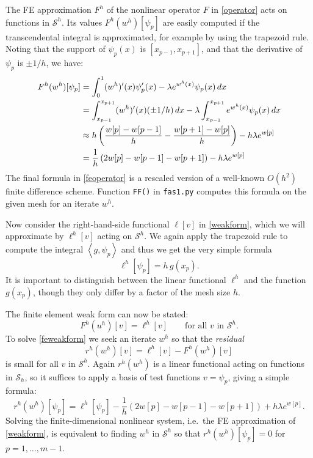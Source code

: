\documentclass[letterpaper,final,12pt,reqno]{amsart}
\newcommand{\ip}[2]{\left<#1,#2\right>}
\begin{document}
The FE approximation $F^h$ of the nonlinear operator $F$ in \eqref{operator} acts on functions in $\mathcal{S}^h$.  Its values $F^h(w^h)[\psi_p]$ are easily computed if the transcendental integral is approximated, for example by using the trapezoid rule.  Noting that the support of $\psi_p(x)$ is $[x_{p-1},x_{p+1}]$, and that the derivative of $\psi_p$ is $\pm 1/h$, we have:
\begin{align}
  F^h(w^h)[\psi_p] &= \int_0^1 (w^h)'(x) \psi_p'(x) - \lambda e^{w^h(x)} \psi_p(x)\, dx  \label{feoperator} \\
    &= \int_{x_{p-1}}^{x_{p+1}} (w^h)'(x) (\pm 1/h)\,dx - \lambda \int_{x_{p-1}}^{x_{p+1}} e^{w^h(x)} \psi_p(x)\, dx \notag \\
    &\approx h \left(\frac{w[p]-w[p-1]}{h} - \frac{w[p+1]-w[p]}{h}\right) - h \lambda e^{w[p]}  \notag \\
    &= \frac{1}{h}\left(2w[p]-w[p-1]-w[p+1]\right) - h \lambda e^{w[p]} \notag
\end{align}
The final formula in \eqref{feoperator} is a rescaled version of a well-known $O(h^2)$ finite difference scheme.  Function \texttt{FF()} in \texttt{fas1.py} computes this formula on the given mesh for an iterate $w^h$.

Now consider the right-hand-side functional $\ell[v]$ in \eqref{weakform}, which we will approximate by $\ell^h[v]$ acting on $\mathcal{S}^h$.  We again apply the trapezoid rule to compute the integral $\ip{g}{\psi_p}$ and thus we get the very simple formula
\begin{equation}
  \ell^h[\psi_p] = h\, g(x_p). \label{ferhs}
\end{equation}
It is important to distinguish between the linear functional $\ell^h$ and the function $g(x_p)$, though they only differ by a factor of the mesh size $h$.

The finite element weak form can now be stated:
\begin{equation}
  F^h(u^h)[v] = \ell^h[v] \qquad \text{for all } v \text{ in } \mathcal{S}^h. \label{feweakform}
\end{equation}
To solve \eqref{feweakform} we seek an iterate $w^h$ so that the \emph{residual}
\begin{equation}
  r^h(w^h)[v] = \ell^h[v] - F^h(w^h)[v]  \label{feresidual}
\end{equation}
is small for all $v$ in $\mathcal{S}^h$.  Again $r^h(w^h)$ is a linear functional acting on functions in $\mathcal{S}_h$, so it suffices to apply a basis of test functions $v=\psi_p$, giving a simple formula:
\begin{equation}
  r^h(w^h)[\psi_p] = \ell^h[\psi_p] - \frac{1}{h}\left(2w[p]-w[p-1]-w[p+1]\right) + h \lambda e^{w[p]}.  \label{feresidualdetail}
\end{equation}
Solving the finite-dimensional nonlinear system, i.e.~the FE approximation of \eqref{weakform}, is equivalent to finding $w^h$ in $\mathcal{S}^h$ so that $r^h(w^h)[\psi_p]=0$ for $p=1,\dots,m-1$.
\end{document}
